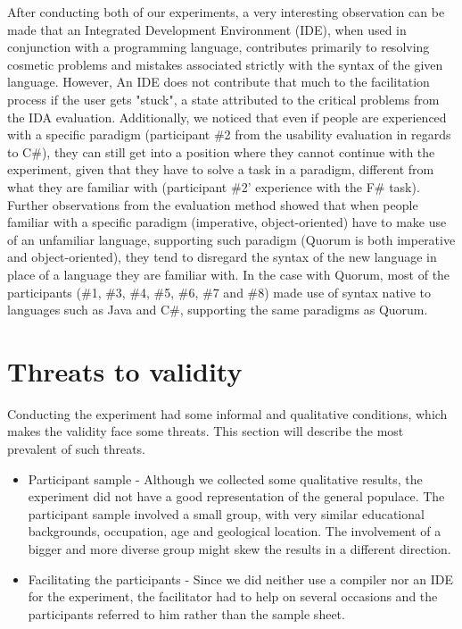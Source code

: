 \documentclass[preprint,10pt]{sigplanconf}
\begin{document}
After conducting both of our experiments, a very interesting observation can be made that an Integrated Development Environment (IDE), when used in conjunction with a programming language, contributes primarily to resolving cosmetic problems and mistakes associated strictly with the syntax of the given language. However, An IDE does not contribute that much to the facilitation process if the user gets "stuck", a state attributed to the critical problems from the IDA evaluation. Additionally, we noticed that even if people are experienced with a specific paradigm (participant \#2 from the usability evaluation in regards to C\#), they can still get into a position where they cannot continue with the experiment, given that they have to solve a task in a paradigm, different from what they are familiar with (participant \#2' experience with the F\# task). Further observations from the evaluation method showed that when people familiar with a specific paradigm (imperative, object-oriented) have to make use of an unfamiliar language, supporting such paradigm (Quorum is both imperative and object-oriented), they tend to disregard the syntax of the new language in place of a language they are familiar with. In the case with Quorum, most of the participants (\#1, \#3, \#4, \#5, \#6, \#7 and \#8) made use of syntax native to languages such as Java and C\#, supporting the same paradigms as Quorum.

\section{Threats to validity}
Conducting the experiment had some informal and qualitative conditions, which makes the validity face some threats. This section will describe the most prevalent of such threats.
\begin{itemize}
\item Participant sample - Although we collected some qualitative results, the experiment did not have a good representation of the general populace. The participant sample involved a small group, with very similar educational backgrounds, occupation, age and geological location. The involvement of a bigger and more diverse group might skew the results in a different direction.
\item Facilitating the participants - Since we did neither use a compiler nor an IDE for the experiment, the facilitator had to help on several occasions and the participants referred to him rather than the sample sheet.
\end{itemize}
\end{document}
